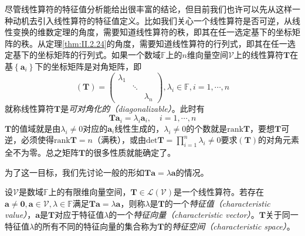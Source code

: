 \documentclass[../main.tex]{subfiles}
\begin{document}
尽管线性算符的特征值分析能给出很丰富的结论，但目前我们也许可以先从这样一种动机去引入线性算符的特征值定义。比如我们关心一个线性算符是否可逆，从线性变换的维数定理的角度，需要知道线性算符的秩，即其在任一选定基下的坐标矩阵的秩。从定理\ref{thm:II.2.24}的角度，需要知道线性算符的行列式，即其在任一选定基下的坐标矩阵的行列式。如果一个数域$\mathbb{F}$上的$n$维向量空间$\mathcal{V}$上的线性算符$\mathbf{T}$在基$\left\{\mathbf{a}_i\right\}$下的坐标矩阵是对角矩阵，即
\[\left(\mathbf{T}\right)=\left(\begin{array}{ccc}\lambda_1&&\\&\ddots&\\&&\lambda_n\end{array}\right),\lambda_i\in\mathbb{F},i=1,\cdots,n\]
就称线性算符$\mathbf{T}$是\emph{可对角化的（diagonalizable）}。此时有
\[\mathbf{Ta}_i=\lambda_i \mathbf{a}_i,\quad i=1,\cdots,n\]
$\mathbf{T}$的值域就是由$\lambda_i\neq 0$对应的$\mathbf{a}_i$线性生成的，$\lambda_i\neq 0$的个数就是$\mathrm{rank}\mathbf{T}$，要想$\mathbf{T}$可逆，必须使得$\mathrm{rank}\mathbf{T}=n$（满秩），或由$\mathrm{det}\mathbf{T}=\prod_{i=1}^n\lambda_i\neq 0$要求$\left(\mathbf{T}\right)$的对角元素全不为零。总之矩阵$\mathbf{T}$的很多性质就能确定了。

为了这一目标，我们先讨论一般的形如$\mathbf{Ta}=\lambda\mathbf{a}$的情况。

\begin{definition}\label{def:II.2.21}
    设$\mathcal{V}$是数域$\mathbb{F}$上的有限维向量空间，$\mathbf{T}\in\mathcal{L}\left(\mathcal{V}\right)$是一个线性算符。若存在$\mathbf{a}\neq\mathbf{0},\mathbf{a}\in\mathcal{V},\lambda\in\mathbb{F}$满足$\mathbf{Ta}=\lambda\mathbf{a}$，则称$\lambda$是$\mathbf{T}$的一个\emph{特征值（characteristic value）}，$\mathbf{a}$是$\mathbf{T}$对应于特征值$\lambda$的一个\emph{特征向量（characteristic vector）}。$\mathbf{T}$关于同一特征值$\lambda$的所有不同的特征向量的集合称为$\mathbf{T}$的\emph{特征空间（characteristic space）}。
\end{definition}
\end{document}
